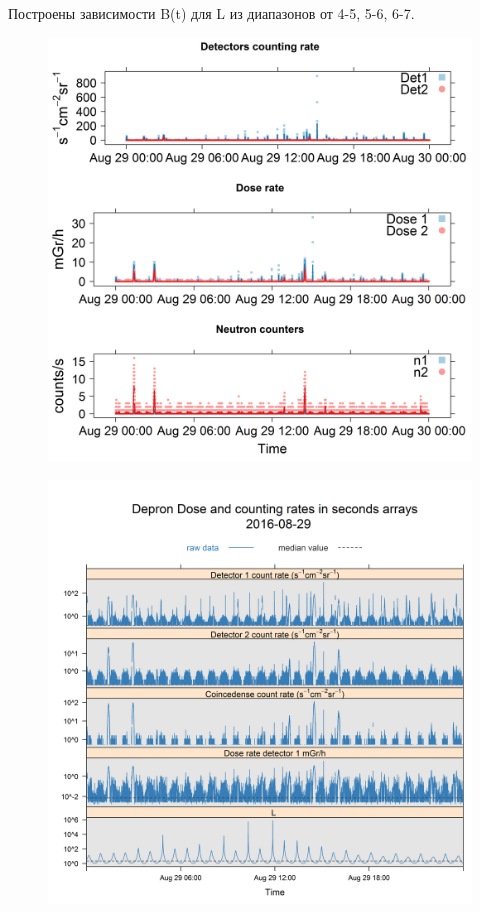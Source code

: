 Построены зависимости B(t) для L из диапазонов от 4-5, 5-6, 6-7.
\begin{figure}
	\centering
	\includegraphics[width=0.7\linewidth]{images/results/depron_sec_log_new08-29-16}
	\caption{}
	\label{fig:depronseclognew08-29-16}
\end{figure}

\begin{figure}
	\centering
	\includegraphics[width=0.7\linewidth]{images/results/depron_sec_log08-29-16}
	\caption{}
	\label{fig:depronseclog08-29-16}
\end{figure}



